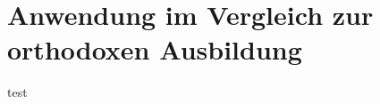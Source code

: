\chapter{Anwendung im Vergleich zur orthodoxen Ausbildung}
\label{cha:Anwendung im Vergleich zur orthodoxen Ausbildung}

test